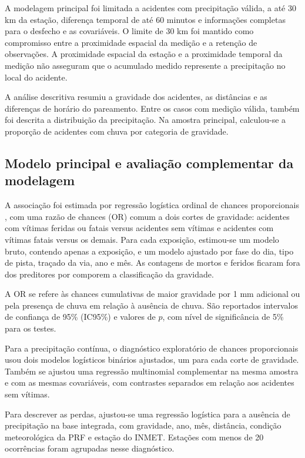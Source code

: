 \documentclass[12pt]{article}
\begin{document}
A modelagem principal foi limitada a acidentes com precipitação válida,
a até 30 km da estação, diferença temporal de até 60 minutos e
informações completas para o desfecho e as covariáveis. O limite de
30 km foi mantido como compromisso entre a proximidade espacial da
medição e a retenção de observações. A proximidade espacial da estação
e a proximidade temporal da medição não asseguram que o acumulado medido
represente a precipitação no local do acidente.

A análise descritiva resumiu a gravidade dos acidentes, as distâncias
e as diferenças de horário do pareamento. Entre os casos com medição
válida, também foi descrita a distribuição da precipitação. Na amostra
principal, calculou-se a proporção de acidentes com chuva por categoria
de gravidade.

\subsection{Modelo principal e avaliação complementar da modelagem}

A associação foi estimada por regressão logística ordinal de chances
proporcionais \cite{mccullagh1980}, com uma razão de chances (OR) comum
a dois cortes de gravidade: acidentes com vítimas feridas ou fatais
versus acidentes sem vítimas e acidentes com vítimas fatais versus os
demais. Para cada exposição, estimou-se um modelo bruto, contendo
apenas a exposição, e um modelo ajustado por fase do dia, tipo de pista,
traçado da via, ano e mês. As contagens de mortos e feridos ficaram fora
dos preditores por comporem a classificação da gravidade.

A OR se refere às chances cumulativas de maior gravidade por 1 mm
adicional ou pela presença de chuva em relação à ausência de chuva.
São reportados intervalos de confiança de 95\% (IC95\%) e valores de
$p$, com nível de significância de 5\% para os testes.

Para a precipitação contínua, o diagnóstico exploratório de chances
proporcionais usou dois modelos logísticos binários ajustados, um para
cada corte de gravidade. Também se ajustou uma regressão multinomial
complementar na mesma amostra e com as mesmas covariáveis, com contrastes
separados em relação aos acidentes sem vítimas.

Para descrever as perdas, ajustou-se uma regressão logística para a
ausência de precipitação na base integrada, com gravidade, ano, mês,
distância, condição meteorológica da PRF e estação do INMET. Estações
com menos de 20 ocorrências foram agrupadas nesse diagnóstico.
\end{document}
